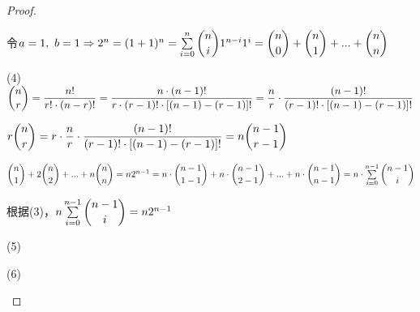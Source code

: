 \documentclass[lang=cn,newtx,10pt,scheme=chinese]{elegantbook}
\begin{document}
\begin{problemset}[习题 1.2]
\begin{proof}
\begin{framed}
            \item[] 令$a=1,\ b=1 \Rightarrow 2^n=(1+1)^n = \sum\limits_{i=0}^{n} \dbinom{n}{i}1^{n-i}1^{i} = \dbinom{n}{0}+\dbinom{n}{1}+...+\dbinom{n}{n}$ \vspace{6pt}
            \item[(4)] $\dbinom{n}{r} = \dfrac{n!}{r! \cdot (n-r)!}=\dfrac{n \cdot (n-1)!}{r \cdot (r-1)! \cdot [(n-1)-(r-1)]!} = \dfrac{n}{r} \cdot \dfrac{(n-1)!}{(r-1)! \cdot [(n-1)-(r-1)]!} $\vspace{6pt}
            \item[] $r\dbinom{n}{r} = r \cdot \dfrac{n}{r} \cdot \dfrac{(n-1)!}{(r-1)! \cdot [(n-1)-(r-1)]!} = n\dbinom{n-1}{r-1}$\vspace{6pt}
            \item[] $\dbinom{n}{1} + 2\dbinom{n}{2} + ... + n\dbinom{n}{n} = n2^{n-1} = n \cdot \dbinom{n-1}{1-1} + n \cdot \dbinom{n-1}{2-1} + ... + n \cdot \dbinom{n-1}{n-1} = n \cdot \sum\limits_{i=0}^{n-1}\dbinom{n-1}{i}$\vspace{6pt}
            \item[] 根据(3)，$n\sum\limits_{i=0}^{n-1}\dbinom{n-1}{i}=n2^{n-1}$\vspace{6pt}
            \item[(5)] $ $\vspace{6pt}
            \item[(6)] $ $\vspace{6pt}
        \end{framed}
    \end{proof}
\end{problemset}
\end{document}
